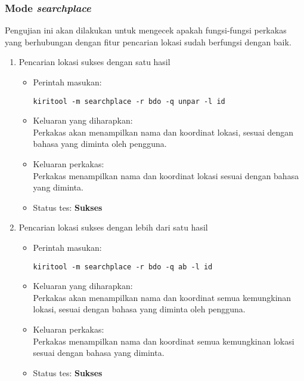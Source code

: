 \subsubsection{Mode \textit{searchplace}}
\label{sec:testing-experiments-searchplace}

Pengujian ini akan dilakukan untuk mengecek apakah fungsi-fungsi perkakas yang berhubungan dengan fitur pencarian lokasi sudah berfungsi dengan baik.

\begin{enumerate}
	\item Pencarian lokasi sukses dengan satu hasil
	\begin{itemize}
		\item Perintah masukan:
		\begin{verbatim}
kiritool -m searchplace -r bdo -q unpar -l id
		\end{verbatim}
		\item Keluaran yang diharapkan: \\
		Perkakas akan menampilkan nama dan koordinat \latlon lokasi, sesuai dengan bahasa yang diminta oleh pengguna.
		\item Keluaran perkakas: \\
		Perkakas menampilkan nama dan koordinat \latlon lokasi sesuai dengan bahasa yang diminta.
		\item Status tes: \textbf{Sukses}
	\end{itemize}
	
	\item Pencarian lokasi sukses dengan lebih dari satu hasil
	\begin{itemize}
		\item Perintah masukan:
		\begin{verbatim}
kiritool -m searchplace -r bdo -q ab -l id
		\end{verbatim}
		\item Keluaran yang diharapkan: \\
		Perkakas akan menampilkan nama dan koordinat \latlon semua kemungkinan lokasi, sesuai dengan bahasa yang diminta oleh pengguna.
		\item Keluaran perkakas: \\
		Perkakas menampilkan nama dan koordinat \latlon semua kemungkinan lokasi sesuai dengan bahasa yang diminta.
		\item Status tes: \textbf{Sukses}
	\end{itemize}
	

\end{enumerate}
